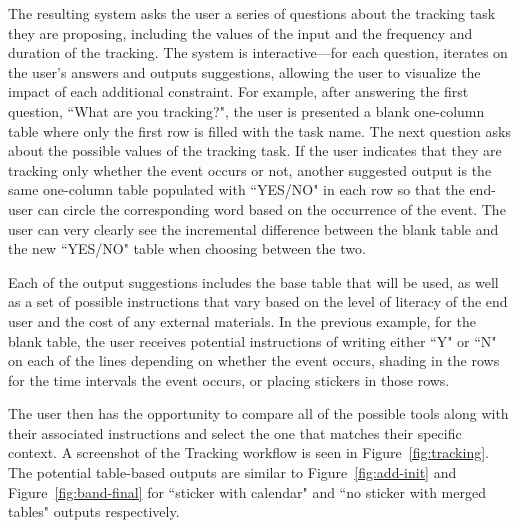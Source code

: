 \documentclass{sig-alternate}
\begin{document}
The resulting system asks the user a series of questions about the tracking task they are proposing, including the values of the input and the frequency and duration of the tracking. The system is interactive---for each question, \nifty iterates on the user's answers and outputs suggestions, allowing the user to visualize the impact of each additional constraint. For example, after answering the first question, ``What are you tracking?", the user is presented a blank one-column table where only the first row is filled with the task name. The next question asks about the possible values of the tracking task. If the user indicates that they are tracking only whether the event occurs or not, another suggested output is the same one-column table populated with ``YES/NO" in each row so that the end-user can circle the corresponding word based on the occurrence of the event. The user can very clearly see the incremental difference between the blank table and the new ``YES/NO" table when choosing between the two.

Each of the output suggestions includes the base table that will be used, as well as a set of possible instructions that vary based on the level of literacy of the end user and the cost of any external materials. In the previous example, for the blank table, the user receives potential instructions of writing either ``Y" or ``N" on each of the lines depending on whether the event occurs, shading in the rows for the time intervals the event occurs, or placing stickers in those rows.

The user then has the opportunity to compare all of the possible tools along with their associated instructions and select the one that matches their specific context. A screenshot of the \nifty Tracking workflow is seen in Figure~\ref{fig:tracking}. The potential table-based outputs are similar to Figure~\ref{fig:add-init} and Figure~\ref{fig:band-final} for ``sticker with calendar" and ``no sticker with merged tables" outputs respectively.
\end{document}
